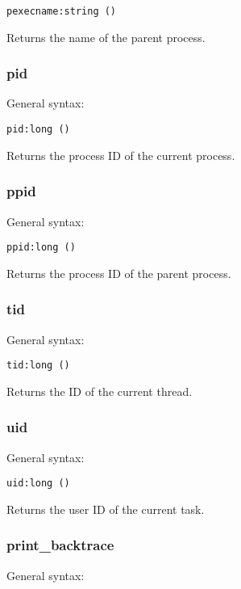 \documentclass[twoside,english]{article}
\newenvironment{vindent}
{\begin{list}{}{\setlength{\listparindent}{6pt}}
\item[]}
{\end{list}}
\begin{document}
\begin{vindent}
\begin{verbatim}
pexecname:string ()
\end{verbatim}
\end{vindent}
Returns the name of the parent process.


\subsubsection{pid}
General syntax:

\begin{vindent}
\begin{verbatim}
pid:long ()
\end{verbatim}
\end{vindent}
Returns the process ID of the current process.


\subsubsection{ppid}
General syntax:

\begin{vindent}
\begin{verbatim}
ppid:long ()
\end{verbatim}
\end{vindent}
Returns the process ID of the parent process.


\subsubsection{tid}
General syntax:

\begin{vindent}
\begin{verbatim}
tid:long ()
\end{verbatim}
\end{vindent}
Returns the ID of the current thread.


\subsubsection{uid}
General syntax:

\begin{vindent}
\begin{verbatim}
uid:long ()
\end{verbatim}
\end{vindent}
Returns the user ID of the current task.


\subsubsection{print\_backtrace}
General syntax:
\end{document}
